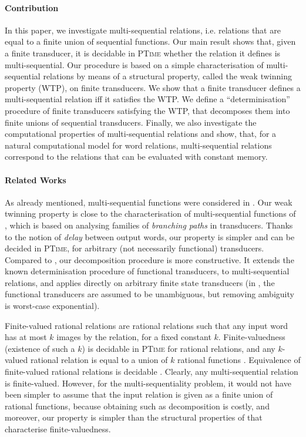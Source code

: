 \documentclass[envcountsame]{llncs}
\begin{document}
\paragraph{Contribution} In this paper, we investigate multi-sequential relations,
i.e. relations that are equal to a finite union of sequential functions. Our
main result shows that, given a finite transducer, it is decidable in
\textsc{PTime} whether the relation it defines is
multi-sequential. Our procedure is based on a simple characterisation
of multi-sequential relations by means of a structural property,
called the weak twinning property (WTP), on finite transducers. We
show that a finite transducer defines a multi-sequential relation iff
it satisfies the WTP. We define a ``determinisation'' procedure of
finite transducers satisfying the WTP, that decomposes them into finite
unions of sequential transducers. Finally, we also investigate the
computational properties of multi-sequential relations and show, that,
for a natural computational model for word relations, 
multi-sequential relations correspond to the relations that
can be evaluated with constant memory.


\paragraph{Related Works} As already mentioned, multi-sequential
functions were considered in \cite{DBLP:conf/stacs/ChoffrutS86}. Our
weak twinning property is close to the characterisation of
multi-sequential functions of \cite{DBLP:conf/stacs/ChoffrutS86}, which is based on analysing 
families of \emph{branching paths} in transducers. Thanks to the
notion of \emph{delay} between output words, our property is simpler
and can be decided in \textsc{PTime}, for arbitrary (not
necessarily functional) transducers. Compared to
\cite{DBLP:conf/stacs/ChoffrutS86}, our decomposition procedure is
more constructive. It extends the known determinisation procedure of
functional transducers, to multi-sequential relations, and applies
directly on arbitrary finite state transducers (in
\cite{DBLP:conf/stacs/ChoffrutS86}, the functional transducers are assumed to be
unambiguous, but removing ambiguity is worst-case exponential). 



Finite-valued rational relations are rational relations such that any
input word has at most $k$ images by the relation, for a fixed
constant $k$. Finite-valuedness (existence of such a $k$) is decidable in \textsc{PTime} for
rational relations, and any $k$-valued rational relation is equal to a
union of $k$ rational functions \cite{journals/mst/SakarovitchS10,SICOMP::Weber1993,DBLP:journals/acta/Weber89}. 
Equivalence of finite-valued rational relations is decidable
\cite{GurIba83}. Clearly, any multi-sequential relation is
finite-valued. However, for the multi-sequentiality problem, it would
not have been simpler to assume that the input relation is given as a
finite union of rational functions, because obtaining such as
decomposition is costly, and moreover, our property is simpler than the structural properties 
of \cite{journals/mst/SakarovitchS10,DBLP:journals/acta/Weber89} that 
characterise finite-valuedness.
\end{document}
